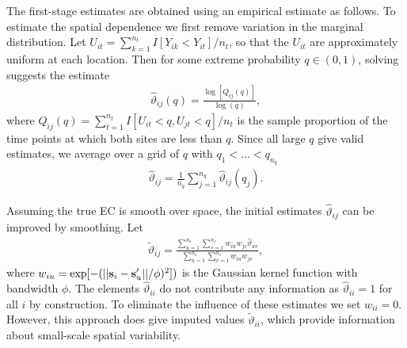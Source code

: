 \documentclass[11pt]{article}
\begin{document}
The first-stage estimates are obtained using an empirical estimate as follows.
To estimate the spatial dependence we first remove variation in the marginal distribution.
Let $U_{it} = \sum_{k=1}^{n_t} I[Y_{ik}<Y_{it}]/n_t$, so that the $U_{it}$ are approximately uniform at each location.
Then for some extreme probability $q\in(0,1)$, solving  suggests the estimate
\begin{align}\label{ebeq:EChat0}
   {\hat \vartheta}_{ij}(q) = \frac{\log[Q_{ij}(q)]}{\log(q)},
\end{align}
where $Q_{ij}(q) = \sum_{t=1}^{n_t}I[U_{it}<q,U_{jt}<q]/n_t$ is the sample proportion of the time points at which both sites are less than $q$.
Since all large $q$ give valid estimates, we average over a grid of $q$ with $q_1<...<q_{n_q}$
\begin{align} \label{ebeq:EChat1}
{\hat \vartheta}_{ij} = \frac{1}{n_q}\sum_{j=1}^{n_q}{\hat \vartheta}_{ij}(q_j).
\end{align}

Assuming the true EC is smooth over space, the initial estimates ${\hat \vartheta}_{ij}$ can be improved by smoothing.
Let
\begin{align} \label{ebeq:EChat2}
  {\tilde \vartheta}_{ij} = \frac{\sum_{u=1}^{n_s}\sum_{v=1}^{n_s} w_{iu}w_{jv}{\hat \vartheta}_{uv}}
  {\sum_{u=1}^{n_s}\sum_{v=1}^{n_s} w_{iu}w_{jv}},
\end{align}
where $w_{iu} = \exp[-(||\mbox{\bf s}_i-\mbox{\bf s}_u'||/\phi)^2])$ is the Gaussian kernel function with bandwidth $\phi$.
The elements ${\hat \vartheta}_{ii}$ do not contribute any information as ${\hat \vartheta}_{ii}=1$ for all $i$ by construction.
To eliminate the influence of these estimates we set $w_{ii}=0$.
However, this approach does give imputed values ${\tilde \vartheta}_{ii}$, which provide information about small-scale spatial variability.
\end{document}
